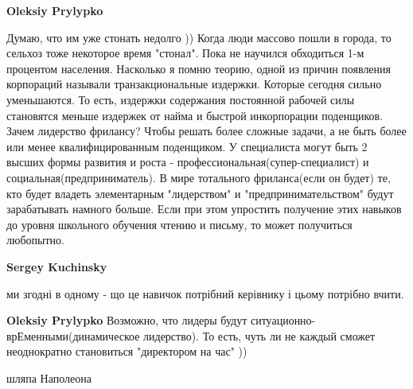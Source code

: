 \begin{itemize}
\begin{itemize}
 
\textbf{Oleksiy Prylypko} 

Думаю, что им уже стонать недолго )) Когда люди массово пошли в города, то
сельхоз тоже некоторое время "стонал". Пока не научился обходиться 1-м
процентом населения. Насколько я помню теорию, одной из причин появления
корпораций называли транзакциональные издержки. Которые сегодня сильно
уменьшаются. То есть, издержки содержания постоянной рабочей силы становятся
меньше издержек от найма и быстрой инкорпорации поденщиков. Зачем лидерство
фрилансу? Чтобы решать более сложные задачи, а не быть более или менее
квалифицированным поденщиком. У специалиста могут быть 2 высших формы развития
и роста - профессиональная(супер-специалист) и социальная(предприниматель). В
мире тотального фриланса(если он будет) те, кто будет владеть элементарным
"лидерством" и "предпринимательством" будут зарабатывать намного больше. Если
при этом упростить получение этих навыков до уровня школьного обучения чтению и
письму, то может получиться любопытно.

 
\textbf{Sergey Kuchinsky} 

ми згодні в одному - що це навичок потрібний керівнику і цьому потрібно вчити.



 
\textbf{Oleksiy Prylypko} Возможно, что лидеры будут
ситуационно-врЕменными(динамическое лидерство). То есть, чуть ли не каждый
сможет неоднократно становиться "директором на час" ))

\end{itemize}

 
шляпа Наполеона

\end{itemize}

